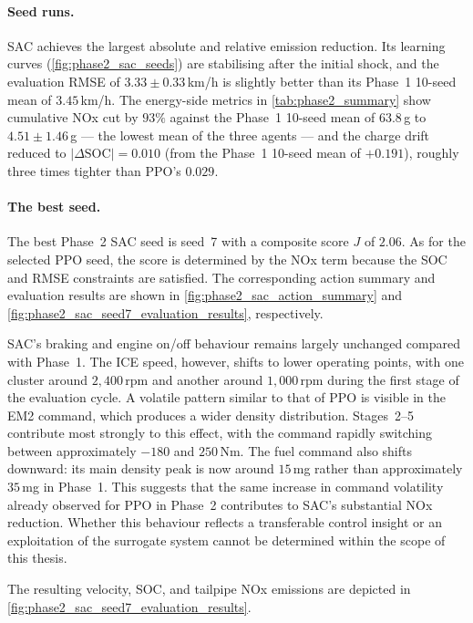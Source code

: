 \paragraph{Seed runs.}
SAC achieves the largest absolute and relative emission reduction. Its learning curves (\autoref{fig:phase2_sac_seeds}) are stabilising after the initial shock, and the evaluation \ac{RMSE} of $3.33 \pm 0.33$\,km/h is slightly better than its Phase~1 10-seed mean of $3.45$\,km/h. The energy-side metrics in \autoref{tab:phase2_summary} show cumulative \ac{NOx} cut by $93\%$ against the Phase~1 10-seed mean of $63.8$\,g to $4.51 \pm 1.46$\,g --- the lowest mean of the three agents --- and the charge drift reduced to $|\Delta\text{SOC}| = 0.010$ (from the Phase~1 10-seed mean of $+0.191$), roughly three times tighter than PPO's $0.029$.

\paragraph{The best seed.}
The best Phase~2 SAC seed is seed~7 with a composite score $J$ of $2.06$. As for the selected PPO seed, the score is determined by the \ac{NOx} term because the \ac{SOC} and \ac{RMSE} constraints are satisfied. The corresponding action summary and evaluation results are shown in \autoref{fig:phase2_sac_action_summary} and \autoref{fig:phase2_sac_seed7_evaluation_results}, respectively.

SAC's braking and engine on/off behaviour remains largely unchanged compared with Phase~1. The \ac{ICE} speed, however, shifts to lower operating points, with one cluster around $2{,}400$\,rpm and another around $1{,}000$\,rpm during the first stage of the evaluation cycle. A volatile pattern similar to that of PPO is visible in the \ac{EM2} command, which produces a wider density distribution. Stages~2--5 contribute most strongly to this effect, with the command rapidly switching between approximately $-180$ and $250$\,Nm. The fuel command also shifts downward: its main density peak is now around $15$\,mg rather than approximately $35$\,mg in Phase~1. This suggests that the same increase in command volatility already observed for PPO in Phase~2 contributes to SAC's substantial \ac{NOx} reduction. Whether this behaviour reflects a transferable control insight or an exploitation of the surrogate system cannot be determined within the scope of this thesis.

The resulting velocity, \ac{SOC}, and tailpipe \ac{NOx} emissions are depicted in \autoref{fig:phase2_sac_seed7_evaluation_results}.

